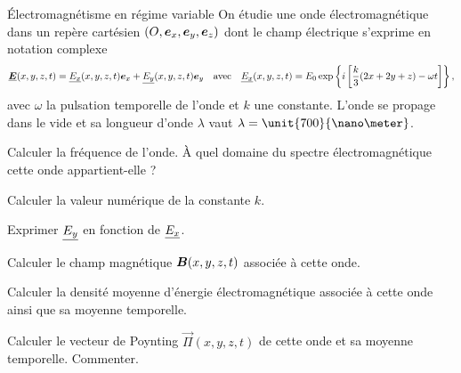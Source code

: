 \begin{td}{Électromagnétisme en régime variable}
	On étudie une onde électromagnétique dans un repère cartésien 
	$(O, \ex, \ey, \ez)$ dont le champ électrique 
	s'exprime en notation complexe
	\begin{equation*}
		\complex{\vece}(x, y, z, t) = \complex{E_x}(x, y, z, t) \ex + 
		\complex{E_y}(x, y, z, t)\ey 
		\quad \mathrm{avec} \quad
		\complex{E_x}(x, y, z, t) = E_0 \exp\left\{i
			\left[\dfrac{k}{3}(2x + 2y + z) - \omega t
		\right]\right\},
	\end{equation*}
	avec $\omega$ la pulsation temporelle de l'onde et $k$ une constante.
	L'onde se propage dans le vide et sa longueur d'onde $\lambda$ 
	vaut $\lambda = \unit{700}{\nano \meter}$.
	\begin{exlist}
		\item Calculer la fréquence de l'onde. À quel domaine du spectre 
		  électromagnétique cette onde appartient-elle ?
		\item Calculer la valeur numérique de la constante $k$.
		\item Exprimer $\underline{E_y}$ en fonction de $\underline{E_x}$.
		\item Calculer le champ magnétique $\vecb(x, y, z, t)$ 
		  associée à cette onde.
		\item Calculer la densité moyenne d'énergie électromagnétique associée
		  à cette onde ainsi que sa moyenne temporelle.
	  \item Calculer le vecteur de Poynting $\vec{\Pi}(x, y, z, t)$ 
		  de cette onde et sa moyenne
		  temporelle. Commenter.
	\end{exlist}



\end{td}
